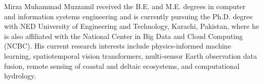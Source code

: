 \documentclass[journal]{IEEEtran}
\begin{document}



\begin{IEEEbiographynophoto}{Mirza Muhammad Muzzamil}
received the B.E. and M.E. degrees in computer and information systems engineering and is currently pursuing the Ph.D. degree with NED University of Engineering and Technology, Karachi, Pakistan, where he is also affiliated with the National Center in Big Data and Cloud Computing (NCBC). His current research interests include physics-informed machine learning, spatiotemporal vision transformers, multi-sensor Earth observation data fusion, remote sensing of coastal and deltaic ecosystems, and computational hydrology.
\end{IEEEbiographynophoto}
\end{document}
